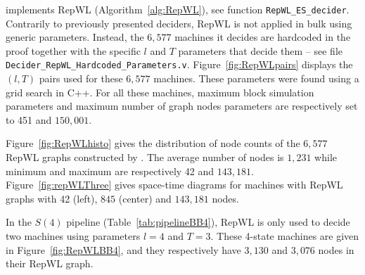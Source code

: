 



\CoqBB implements RepWL (Algorithm~\ref{alg:RepWL}), see function \texttt{RepWL\_ES\_decider}. Contrarily to previously presented deciders, RepWL is not applied in bulk using generic parameters. Instead, the ${6,577}$ machines it decides are hardcoded in the proof together with the specific $l$ and $T$ parameters that decide them -- see file \texttt{Decider\_RepWL\_Hardcoded\_Parameters.v}. Figure~\ref{fig:RepWLpairs} displays the $(l,T)$ pairs used for these ${6,577}$ machines. These parameters were found using a grid search in C++. For all these machines, maximum block simulation parameters and maximum number of graph nodes parameters are respectively set to 451 and ${150,001}$.

Figure~\ref{fig:RepWLhisto} gives the distribution of node counts of the ${6,577}$ RepWL graphs constructed by \CoqBB. The average number of nodes is $1{,}231$ while minimum and maximum are respectively 42 and $143{,}181$. Figure~\ref{fig:repWLThree} gives space-time diagrams for machines with RepWL graphs with 42 (left), ${845}$ (center) and $143{,}181$ nodes. 

In the $S(4)$ pipeline (Table~\ref{tab:pipelineBB4}), RepWL is only used to decide two machines using parameters $l=4$ and $T=3$. These 4-state machines are given in Figure~\ref{fig:RepWLBB4}, and they respectively have $3{,}130$ and $3{,}076$ nodes in their RepWL graph.

